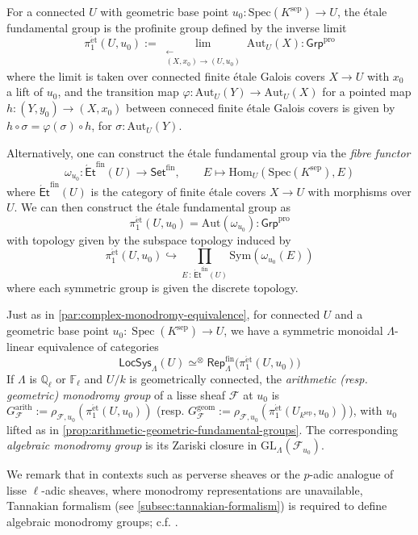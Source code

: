 \documentclass[11pt,letterpaper]{article}
\theoremstyle{numberfirstplain}
\numberwithin{equation}{theorem}
\theoremstyle{numberfirstupright}
\begin{document}
For a connected $U$ with geometric base point $u_0:\mathrm{Spec}(K^{\mathrm{sep}})\rightarrow U$, the étale fundamental group is the profinite group defined by the inverse limit
$$\pi_1^{\mathrm{\acute{e}t}}(U,u_0):=\lim_{\substack{\longleftarrow\\(X,x_0)\to(U,u_0)}}\mathrm{Aut}_U(X):\mathsf{Grp}^{\mathrm{pro}}$$
where the limit is taken over connected finite étale Galois covers $X\rightarrow U$ with $x_0$ a lift of $u_0$, and the transition map $\varphi:\mathrm{Aut}_U(Y)\rightarrow\mathrm{Aut}_U(X) $ for a pointed map $h:(Y,y_0)\rightarrow (X,x_0)$ between conneced finite étale Galois covers is given by $h\circ \sigma=\varphi(\sigma)\circ h$, for $\sigma:\mathrm{Aut}_U(Y)$. 

Alternatively, one can construct the étale fundamental group via the \textit{fibre functor}
$$\omega_{u_0}:\mathsf{\acute{E}t}^{\mathrm{fin}}(U)\rightarrow\mathsf{Set}^{\mathrm{fin}},\qquad E\mapsto \mathrm{Hom}_U(\mathrm{Spec}(K^{\mathrm{sep}}),E)$$
where $\mathsf{\acute{E}t}^{\mathrm{fin}}(U)$ is the category of finite étale covers $X\rightarrow U$ with morphisms over $U$. 
We can then construct the étale fundamental group as 
$$\pi_1^{\mathrm{\acute{e}t}}(U,u_0)=\mathrm{Aut}(\omega_{u_0}):\mathsf{Grp}^{\mathrm{pro}}$$
with topology given by the subspace topology induced by
$$\pi_1^{\mathrm{\acute{e}t}}(U,u_0)\hookrightarrow \prod_{E\,:\,\mathsf{\acute{E}t}^{\mathrm{fin}}(U)}\mathrm{Sym}(\omega_{u_0}(E))$$
where each symmetric group is given the discrete topology. 

Just as in \cref{par:complex-monodromy-equivalence}, for connected $U$ and a geometric base point $u_0:\operatorname{Spec}(K^{\mathrm{sep}})\to U$, we have a symmetric monoidal $\Lambda$-linear equivalence of categories
\[
\mathsf{LocSys}_\Lambda(U)
\simeq^{\otimes}
\mathsf{Rep}_\Lambda^{\mathrm{fin}}\bigl(\pi_1^{\mathrm{\acute{e}t}}(U,u_0)\bigr)
\]
If $\Lambda$ is $\mathbb Q_\ell$ or $\mathbb F_\ell$ and $U/k$ is geometrically connected, the \textit{arithmetic (resp. geometric) monodromy group} of a lisse sheaf $\mathcal F$ at $u_0$ is $G_{\mathcal F}^{\mathrm{arith}}:=\rho_{\mathcal F,u_0}(\pi_1^{\mathrm{\acute{e}t}}(U,u_0))$ (resp. $G_{\mathcal F}^{\mathrm{geom}}:=\rho_{\mathcal F,u_0}(\pi_1^{\mathrm{\acute{e}t}}(U_{k^{\mathrm{sep}}},u_0))$), with $u_0$ lifted as in \cref{prop:arithmetic-geometric-fundamental-groups}.
The corresponding \textit{algebraic monodromy group} is its Zariski closure in $\mathrm{GL}_\Lambda(\mathcal F_{u_0})$.

We remark that in contexts such as perverse sheaves or the $p$-adic analogue of lisse $\ell$-adic sheaves, where monodromy representations are unavailable, Tannakian formalism (see \cref{subsec:tannakian-formalism}) is required to define algebraic monodromy groups; c.f. \cite[\S2]{Crew1992Isocrystals}. 
\end{document}
